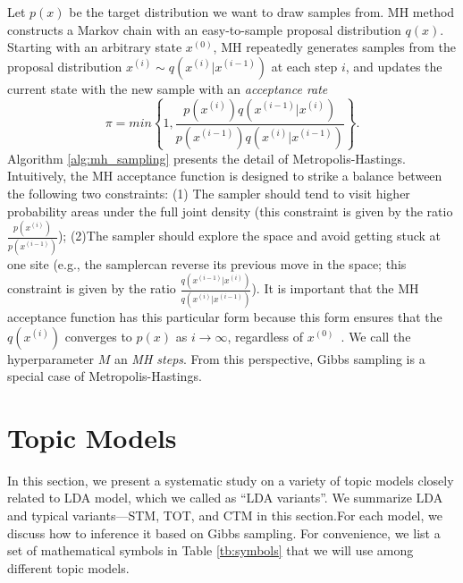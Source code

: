 \documentclass[10pt,journal,cspaper,compsoc]{IEEEtran}
\begin{document}
	Let $p(x)$ be the target distribution we want to draw samples from.
	MH method constructs a Markov chain with an easy-to-sample proposal distribution $q(x)$.
	Starting with an arbitrary state $x^{(0)}$, MH repeatedly generates samples from the proposal distribution $x^{(i)} \sim q(x^{(i)}|x^{(i-1)})$ at each step $i$, and updates the current state with the new sample with an {\em acceptance rate}
	\[
	\pi = min\left\{1, \frac{p(x^{(i)})q(x^{(i-1)}|x^{(i)})}{p(x^{(i-1)})q({x^{(i)}|x^{(i-1)}})}\right\}.
	\]
	Algorithm \ref{alg:mh_sampling} presents the detail of Metropolis-Hastings.
	Intuitively, the MH acceptance function is designed to strike a
    balance between the following two constraints: (1) The sampler should tend to visit higher
    probability areas under the full joint density (this constraint is given by the ratio $\frac{p(x^{(i)})}{p(x^{(i-1)})}$); (2)The sampler should explore the space and avoid getting stuck at one site (e.g., the samplercan reverse its previous move in the space; this constraint is given by the ratio $\frac{q(x^{(i-1)}|x^{(i)})}{q({x^{(i)}|x^{(i-1)}})}$). It is important that the MH acceptance function has this particular form because this form ensures that the 
     $q(x^{(i)})$ converges to $p(x)$ as $i \to \infty$, regardless of $x^{(0)}$~\cite{levin2009markov}. We call the hyperparameter $M$ an {\em MH steps}.
	From this perspective, Gibbs sampling is a special case of Metropolis-Hastings.

    
    \section{Topic Models}
    In this section, we present a systematic study
    on a variety of topic models closely related to LDA model,
    which we called as ``LDA variants''. 
    We summarize LDA and typical
    variants---STM, TOT, and CTM in this section.For each model, we discuss how to inference it based on Gibbs sampling. For convenience, we list a set of mathematical symbols in Table \ref{tb:symbols} that we will use among different topic models.
    
\end{document}
